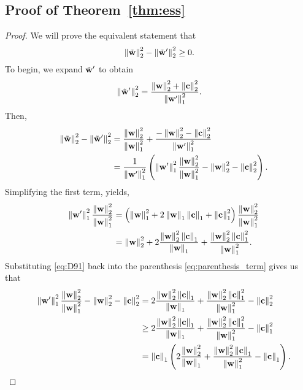 \subsection{Proof of Theorem~\ref{thm:ess}} \label{sec:proof:ess}
\begin{proof}
    We will prove the equivalent statement that
    \begin{equation} \label{eq: ess:proof:1}
        \left\lVert \tilde{{\bf w}} \right\rVert^2_2 - \left\lVert \tilde{{\bf w}}' \right\rVert^2_2 \geq 0.
    \end{equation}
    To begin, we expand $\tilde{{\bf w}}'$ to obtain
    \begin{equation}
        \left\lVert\tilde{{\bf w}}'\right\rVert_2^2 = \frac{ \left\lVert{\bf w}\right\rVert_2^2 + \left\lVert{\bf c}\right\rVert_2^2 }{ \left\lVert{\bf w}'\right\rVert_1^2}.
    \end{equation}
    Then,
    \begin{align}
        \mathrel{\phantom{=}} \left\lVert \tilde{{\bf w}} \right\rVert^2_2 - \left\lVert \tilde{{\bf w}}' \right\rVert^2_2 &= \frac{ \left\lVert{\bf w}\right\rVert_2^2 }{ \left\lVert{\bf w}\right\rVert_1^2} + \frac{ -\left\lVert{\bf w}\right\rVert_2^2 - \left\lVert{\bf c}\right\rVert_2^2 }{ \left\lVert{\bf w}'\right\rVert_1^2} \\
        &= \frac{1}{ \left\lVert{\bf w}'\right\rVert_1^2 } \left( \left\lVert{\bf w}'\right\rVert_1^2 \frac{ \left\lVert{\bf w}\right\rVert_2^2 }{ \left\lVert{\bf w}\right\rVert_1^2} -\left\lVert{\bf w}\right\rVert_2^2 - \left\lVert{\bf c}\right\rVert_2^2 \right).\label{eq:parenthesis_term}
    \end{align}
    Simplifying the first term, yields,
    \begin{align}
        \mathrel{\phantom{=}} \left\lVert{\bf w}'\right\rVert_1^2 \frac{ \left\lVert{\bf w}\right\rVert_2^2 }{ \left\lVert{\bf w}\right\rVert_1^2} &= \left( \left\lVert{\bf w}\right\rVert_1^2 + 2 \left\lVert{\bf w}\right\rVert_1 \left\lVert{\bf c}\right\rVert_1 + \left\lVert{\bf c}\right\rVert_1^2 \right) \frac{ \left\lVert{\bf w}\right\rVert_2^2 }{ \left\lVert{\bf w}\right\rVert_1^2} \\
        &= \left\lVert{\bf w}\right\rVert_2^2 + 2 \frac{ \left\lVert {\bf w} \right\rVert_2^2 \left\lVert {\bf c} \right\rVert_1 }{ \left\lVert {\bf w} \right\rVert_1 } + \frac{ \left\lVert {\bf w} \right\rVert_2^2 \left\lVert {\bf c} \right\rVert_1^2 }{ \left\lVert {\bf w} \right\rVert_1^2 }.\label{eq:D91}
    \end{align}
    Substituting \eqref{eq:D91} back into the parenthesis \eqref{eq:parenthesis_term} gives us that
    \begin{align}
        \mathrel{\phantom{=}} \norm{\vw'}_1^2 \frac{ \norm{\vw}_2^2 }{ \norm{\vw}_1^2} -\norm{\vw}_2^2 - \norm{\vc}_2^2 &= 2 \frac{ \norm{ \vw }_2^2 \norm{ \vc }_1 }{ \norm{ \vw }_1 } + \frac{ \norm{ \vw }_2^2 \norm{ \vc }_1^2 }{ \norm{ \vw }_1^2 } - \norm{\vc}_2^2 \\
        &\geq 2 \frac{ \norm{ \vw }_2^2 \norm{ \vc }_1 }{ \norm{ \vw }_1 } + \frac{ \norm{ \vw }_2^2 \norm{ \vc }_1^2 }{ \norm{ \vw }_1^2 } - \norm{\vc}_1^2 \\
        &= \norm{\vc}_1 \left( 2 \frac{ \norm{ \vw }_2^2 }{ \norm{ \vw }_1 } + \frac{ \norm{ \vw }_2^2 \norm{ \vc }_1 }{ \norm{ \vw }_1^2 } - \norm{\vc}_1 \right).\label{eq:D94}

\end{align}
\end{proof}
